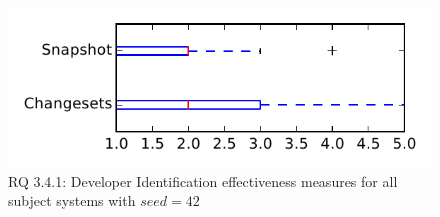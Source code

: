 
\begin{figure}
\centering
\includegraphics[height=0.4\textheight]{figures/dit_seed/rq1_tiny_42}
\caption{RQ 3.4.1: Developer Identification effectiveness measures for all subject systems with $seed=42$}
\label{fig:dit_seed:rq1:tiny}
\end{figure}
